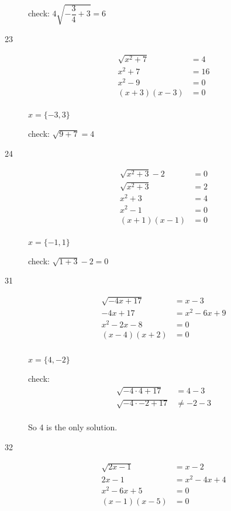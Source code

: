 \documentclass[fleqn,addpoints]{exam}
\begin{document}
\begin{description}
check: $4 \sqrt{- \dfrac{3}{4}+3} = 6$

\item[23]
\begin{align*}
  \sqrt{x^2+7} &= 4 \\
  x^2+7 &= 16 \\
  x^2-9 &= 0 \\
  (x+3)(x-3) &= 0 \\
\end{align*}

$x = \{-3, 3\}$

check: $\sqrt{9 + 7} = 4$

\item[24]
\begin{align*}
  \sqrt{x^2+3} - 2 &= 0 \\
  \sqrt{x^2+3} &= 2 \\
  x^2+3 &= 4 \\
  x^2 - 1 &= 0 \\
  (x+1)(x-1) &= 0 \\
\end{align*}

$x = \{-1, 1\}$

check: $\sqrt{1+3} - 2 = 0$

\item[31]
\begin{align*}
  \sqrt{-4x+17} &= x-3 \\
  -4x+17 &= x^2-6x + 9 \\
  x^2 - 2x - 8 &= 0 \\
  (x-4)(x+2) &= 0 \\
\end{align*} \\

$x = \{4, -2 \}$

check:
\begin{align*}
  \sqrt{-4 \cdot 4 + 17} &= 4 - 3 \\
  \sqrt{-4 \cdot -2 + 17} &\neq -2 - 3 \\
\end{align*}

So 4 is the only solution.

\item[32]
\begin{align*}
  \sqrt{2x-1} &= x-2 \\
  2x-1 &= x^2 - 4x + 4 \\
  x^2 - 6x + 5 &= 0 \\
  (x-1)(x-5) &= 0 \\
\end{align*}


\end{description}
\end{document}
